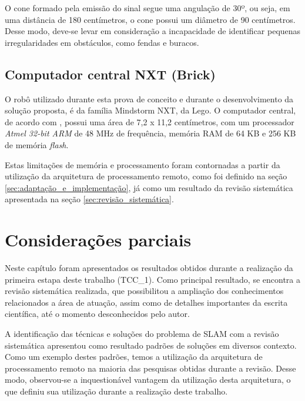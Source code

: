 \begin{itemize}
				O cone formado pela emissão do sinal segue uma angulação de 30º, ou seja, em uma distância de 180 centímetros, o cone possui um diâmetro de 90 centímetros. Desse modo, deve-se levar em consideração a incapacidade de identificar pequenas irregularidades em obstáculos, como fendas e buracos.

		\end{itemize}

		\subsection{Computador central NXT (Brick)} %
		\label{sub:brick}

			O robô utilizado durante esta prova de conceito e durante o desenvolvimento da solução proposta, é da família Mindstorm NXT, da Lego. O computador central, de acordo com \cite{legonxj}, possui uma área de 7,2 x 11,2 centímetros, com um processador \textit{Atmel 32-bit ARM} de 48 MHz de frequência, memória RAM de 64 KB e 256 KB de memória \textit{flash}.

			Estas limitações de memória e processamento foram contornadas a partir da utilização da arquitetura de processamento remoto, como foi definido na seção \ref{sec:adaptação_e_implementação}, já como um resultado da revisão sistemática apresentada na seção \ref{sec:revisão_sistemática}.
		




\section{Considerações parciais} %
\label{sec:consideracoes}
	
	Neste capítulo foram apresentados os resultados obtidos durante a realização da primeira estapa deste trabalho (TCC\_1). Como principal resultado, se encontra a revisão sistemática realizada, que possibilitou a ampliação dos conhecimentos relacionados a área de atuação, assim como de detalhes importantes da escrita científica, até o momento desconhecidos pelo autor.

	A identificação das técnicas e soluções do problema de SLAM com a revisão sistemática apresentou como resultado padrões de soluções em diversos contexto. Como um exemplo destes padrões, temos a utilização da arquitetura de processamento remoto na maioria das pesquisas obtidas durante a revisão. Desse modo, observou-se a inquestionável vantagem da utilização desta arquitetura, o que definiu sua utilização durante a realização deste trabalho.

